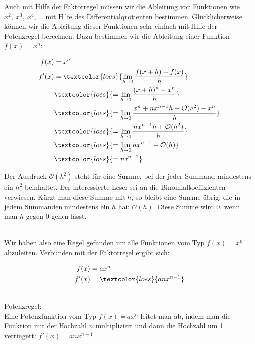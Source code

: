 Auch mit Hilfe der Faktorregel müssen wir die Ableitung von Funktionen wie \(x^2,\ x^3,\ x^4,\dots\) mit Hilfe des Differentialquotienten bestimmen. Glücklicherweise können wir die Ableitung dieser Funktionen sehr einfach mit Hilfe der Potenzregel berechnen. Dazu bestimmen wir die Ableitung einer Funktion \(f(x)=x^n\):\\
\begin{minipage}[t]{\textwidth}
	\begin{minipage}{0.5\textwidth}
		\begin{align*}
			f(x)&=x^n\\
			f'(x)&=\textcolor{loes}{\lim\limits_{h\to 0}\frac{f(x+h)-f(x)}{h}}\\
			&\textcolor{loes}{=\lim\limits_{h\to 0}\frac{(x+h)^n-x^n}{h}}\\
			&\textcolor{loes}{=\lim\limits_{h\to 0}\frac{x^n+nx^{n-1}h+\mathcal{O}(h^2)-x^n}{h}}\\
			&\textcolor{loes}{=\lim\limits_{h\to 0}\frac{nx^{n-1}h+\mathcal{O}(h^2)}{h}}\\
			&\textcolor{loes}{=\lim\limits_{h\to 0}nx^{n-1}+\mathcal{O}(h)}\\
			&\textcolor{loes}{=nx^{n-1}}\\
		\end{align*}
	\end{minipage}
	\begin{minipage}{0.5\textwidth}
		\textcolor{loes}{Der Ausdruck \(\mathcal{O}(h^2)\) steht für eine Summe, bei der jeder Summand mindestens ein \(h^2\) beinhaltet. Der interessierte Leser sei an die Binomialkoeffizienten verwiesen. Kürzt man diese Summe mit \(h\), so bleibt eine Summe übrig, die in jedem Summanden mindestens ein \(h\) hat: \(\mathcal{O}(h)\). Diese Summe wird 0, wenn man \(h\) gegen 0 gehen lässt.}
	\end{minipage}
\end{minipage}\\
Wir haben also eine Regel gefunden um alle Funktionen vom Typ \(f(x)=x^n\) abzuleiten. Verbunden mit der Faktorregel ergibt sich:\\
\begin{minipage}[t]{\textwidth}
	\begin{minipage}{0.3\textwidth}
		\begin{align*}
			f(x)&=ax^n\\
			f'(x)&=\textcolor{loes}{anx^{n-1}}\\
		\end{align*}
	\end{minipage}
	\begin{minipage}{0.7\textwidth}
		\begin{tcolorbox}
			\phantom{text}\\
			\textcolor{loestc}{Potenzregel:\\
				Eine Potenzfunktion vom Typ \(f(x)=ax^n\) leitet man ab, indem man die Funktion mit der Hochzahl \(n\) multipliziert und dann die Hochzahl um 1 verringert: \(f'(x)=anx^{n-1}\)}\\
		\end{tcolorbox}
	\end{minipage}
\end{minipage}\\
